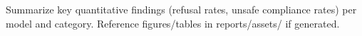 Summarize key quantitative findings (refusal rates, unsafe compliance rates) per model and category. Reference figures/tables in reports/assets/ if generated.

